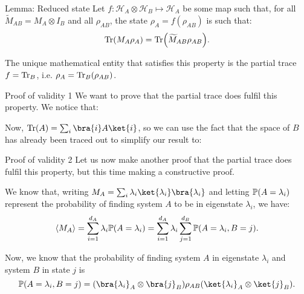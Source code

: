 \documentclass[a4paper]{article}
\begin{document}
\begin{parag}{Lemma: Reduced state}
    Let $f: \mathcal{H}_{A} \otimes \mathcal{H}_B \mapsto \mathcal{H}_A$ be some map such that, for all $\widetilde{M}_{AB} = M_A \otimes I_B$ and all $\rho_{AB}$, the state $\rho_A = f\left(\rho_{AB}\right)$ is such that: 
    \[\Tr\left(M_A \rho_A\right) = \Tr\left(\widetilde{M}_{AB} \rho_{AB}\right).\]

    The unique mathematical entity that satisfies this property is the partial trace $f = \operatorname{Tr}_B$, i.e. $\rho_A = \Tr_B\left(\rho_{AB}\right)$.

    \begin{subparag}{Proof of validity 1}
        We want to prove that the partial trace does fulfil this property. We notice that: 

        Now, $\Tr\left(A\right) = \sum_{i} \bra{i} A \ket{i}$, so we can use the fact that the space of $B$ has already been traced out to simplify our result to: 
    \end{subparag}

    \begin{subparag}{Proof of validity 2}
        Let us now make another proof that the partial trace does fulfil this property, but this time making a constructive proof. 

        We know that, writing $M_A = \sum_{i} \lambda_i \ket{\lambda_i}\bra{\lambda_i}$ and letting $\prob\left(A = \lambda_i\right)$ represent the probability of finding system $A$ to be in eigenstate $\lambda_i$, we have:
        \[\left\langle M_A \right\rangle = \sum_{i=1}^{d_A} \lambda_i \prob\left(A = \lambda_i\right) = \sum_{i=1}^{d_A} \lambda_i \sum_{j=1}^{d_B} \prob\left(A = \lambda_i, B = j\right).\]
        
        Now, we know that the probability of finding system $A$ in eigenstate $\lambda_i$ and system $B$ in state $j$ is 
        \[\prob\left(A = \lambda_i, B = j\right) = \left(\bra{\lambda_i}_A \otimes \bra{j}_B\right) \rho_{AB} \left(\ket{\lambda_i}_A \otimes \ket{j}_B\right).\]


\end{subparag}
\end{parag}
\end{document}
